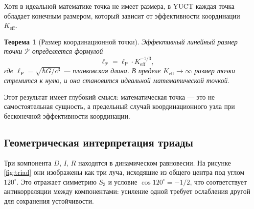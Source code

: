 \documentclass[12pt,a4paper]{article}
\newtheorem{theorem}{Теорема}
\newcommand{\Keff}{K_{\mathrm{eff}}}
\newcommand{\calP}{\mathcal{P}}
\newcommand{\ellP}{\ell_{\mathrm{P}}}
\begin{document}
	Хотя в идеальной математике точка не имеет размера, в YUCT каждая точка обладает конечным размером, который зависит от эффективности координации \(\Keff\).
	
	\begin{theorem}[Размер координационной точки]
		Эффективный линейный размер точки \(\calP\) определяется формулой
		\[
		\ell_{\calP} = \ellP \cdot \Keff^{-1/3},
		\]
		где \(\ellP = \sqrt{\hbar G / c^3}\) — планковская длина.
		В пределе \(\Keff \to \infty\) размер точки стремится к нулю, и она становится идеальной математической точкой.
	\end{theorem}
	
	Этот результат имеет глубокий смысл: математическая точка — это не самостоятельная сущность, а предельный случай координационного узла при бесконечной эффективности координации.
	
	\subsection{Геометрическая интерпретация триады}
	
	Три компонента \(D\), \(I\), \(R\) находятся в динамическом равновесии. На рисунке \ref{fig:triad} они изображены как три луча, исходящие из общего центра под углом \(120^\circ\). Это отражает симметрию \(S_3\) и условие \(\cos 120^\circ = -1/2\), что соответствует антикорреляции между компонентами: усиление одной требует ослабления другой для сохранения устойчивости.
	
\end{document}
